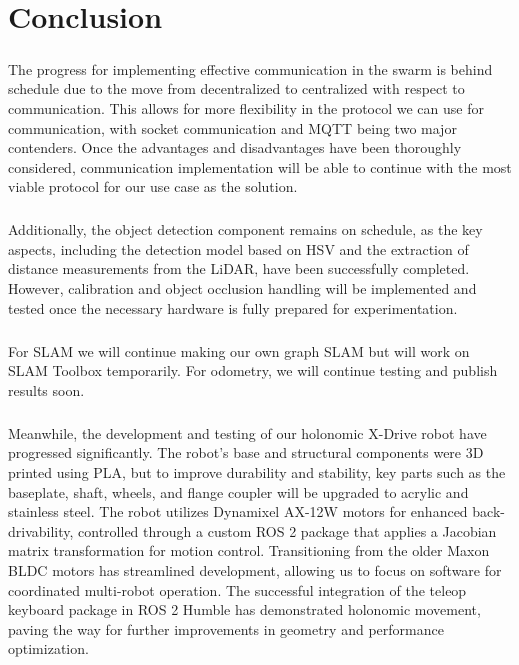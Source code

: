 \chapter{Conclusion}

\paragraph*{}
The progress for implementing effective communication in the swarm is behind schedule due to the move from decentralized to centralized with respect to communication. This allows for more flexibility in the protocol we can use for communication, with socket communication and MQTT being two major contenders. Once the advantages and disadvantages have been thoroughly considered, communication implementation will be able to continue with the most viable protocol for our use case as the solution.

\paragraph*{}
Additionally, the object detection component remains on schedule, as the key aspects, including the detection model based on HSV and the extraction of distance measurements from the LiDAR, have been successfully completed. However, calibration and object occlusion handling will be implemented and tested once the necessary hardware is fully prepared for experimentation.

\paragraph*{}
For SLAM we will continue making our own graph SLAM but will work on SLAM Toolbox temporarily. For odometry, we will continue testing and publish results soon.

\paragraph*{}
Meanwhile, the development and testing of our holonomic X-Drive robot have progressed significantly. The robot’s base and structural components were 3D printed using PLA, but to improve durability and stability, key parts such as the baseplate, shaft, wheels, and flange coupler will be upgraded to acrylic and stainless steel. The robot utilizes Dynamixel AX-12W motors for enhanced back-drivability, controlled through a custom ROS 2 package that applies a Jacobian matrix transformation for motion control. Transitioning from the older Maxon BLDC motors has streamlined development, allowing us to focus on software for coordinated multi-robot operation. The successful integration of the teleop keyboard package in ROS 2 Humble has demonstrated holonomic movement, paving the way for further improvements in geometry and performance optimization.

